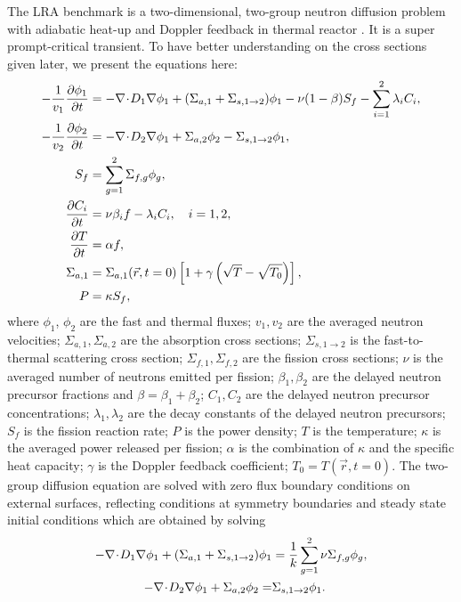 The LRA benchmark is a two-dimensional, two-group neutron diffusion problem with adiabatic heat-up and Doppler feedback in thermal reactor \cite{ANL_BPB}.  It is a super prompt-critical transient.  To have better understanding on the cross sections given later, we present the equations here:
\begin{subequations}
\begin{align}
-\frac{1}{v_1} \frac{\partial \phi_1}{\partial t} &= -\mathbf{\nabla}\! \cdot \! D_1 \mathbf{\nabla}\phi_1 + (\Sigma_{a,1} + \Sigma_{s, 1\rightarrow 2})\phi_1 - \nu(1-\beta)S_f  - \sum_{i=1}^2 \lambda_i C_i, \\
-\frac{1}{v_2} \frac{\partial \phi_2}{\partial t} &= -\mathbf{\nabla}\! \cdot \! D_2 \mathbf{\nabla}\phi_1 + \Sigma_{a,2}\phi_2 - \Sigma_{s, 1\rightarrow 2}\phi_1, \\
S_f &= \sum_{g=1}^2 \Sigma_{f,g} \phi_g, \\
\frac{\partial C_i}{\partial t} &= \nu\beta_i f - \lambda_i C_i, \quad i=1,2, \\
\frac{\partial T}{\partial t} &= \alpha f, \label{eq:lra-temp} \\
\Sigma_{a,1} &= \Sigma_{a,1}(\vec{r}, t=0) \left[1+\gamma\left(\sqrt{T} - \sqrt{T_0}\right)\right], \\
P &= \kappa S_f,
\end{align}
\end{subequations}
where $\phi_1$, $\phi_2$ are the fast and thermal fluxes; $v_1, v_2$ are the averaged neutron velocities; $\Sigma_{a,1}, \Sigma_{a,2}$ are the absorption cross sections; $\Sigma_{s,1\rightarrow 2}$ is the fast-to-thermal scattering cross section; $\Sigma_{f,1}, \Sigma_{f,2}$ are the fission cross sections; $\nu$ is the averaged number of neutrons emitted per fission; $\beta_1, \beta_2$ are the delayed neutron precursor fractions and $\beta=\beta_1 + \beta_2$; $C_1, C_2$ are the delayed neutron precursor concentrations; $\lambda_1, \lambda_2$ are the decay constants of the delayed neutron precursors; $S_f$ is the fission reaction rate; $P$ is the power density; $T$ is the temperature; $\kappa$ is the averaged power released per fission; $\alpha$ is the combination of $\kappa$ and the specific heat capacity; $\gamma$ is the Doppler feedback coefficient; $T_0=T(\vec{r}, t=0)$.
The two-group diffusion equation are solved with zero flux boundary conditions on external surfaces, reflecting conditions at symmetry boundaries and steady state initial conditions which are obtained by solving
\begin{align}
-\mathbf{\nabla}\! \cdot \! D_1 \mathbf{\nabla}\phi_1 + (\Sigma_{a,1} + \Sigma_{s, 1\rightarrow 2})\phi_1 &= \frac{1}{k}\sum_{g=1}^2 \nu\Sigma_{f,g}\phi_g, \\
-\mathbf{\nabla}\! \cdot \! D_2 \mathbf{\nabla}\phi_1 + \Sigma_{a,2}\phi_2 =& \Sigma_{s, 1\rightarrow 2}\phi_1.
\end{align}
